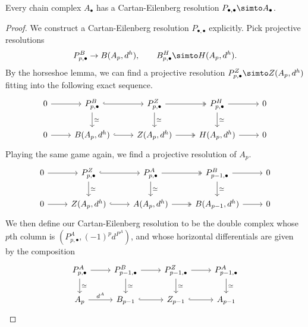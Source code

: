 \documentclass[main.tex]{subfiles}
\begin{document}
\begin{proposition}
  Every chain complex $A_{\bullet}$ has a Cartan-Eilenberg resolution $P_{\bullet,\bullet} \simto A_{\bullet}$.
\end{proposition}
\begin{proof}
  We construct a Cartan-Eilenberg resolution $P_{\bullet,\bullet}$ explicitly. Pick projective resolutions
  \begin{equation*}
    P^{B}_{p,\bullet} \to B(A_{p}, d^{h}),\qquad B^{H}_{p,\bullet} \simto H(A_{p}, d^{h}).
  \end{equation*}
  By the horseshoe lemma, we can find a projective resolution $P^{Z}_{p,\bullet} \simto Z(A_{p}, d^{h})$ fitting into the following exact sequence.
  \begin{equation}
    \label{eq:cartan_eilenberg_resolution_ses_1}
    \begin{tikzcd}
      0
      \arrow[r]
      & P^{B}_{p,\bullet}
      \arrow[r, hook]
      \arrow[d, "\simeq"]
      & P^{Z}_{p,\bullet}
      \arrow[r, two heads]
      \arrow[d, "\simeq"]
      & P^{H}_{p,\bullet}
      \arrow[r]
      \arrow[d, "\simeq"]
      & 0
      \\
      0
      \arrow[r]
      & B(A_{p}, d^{h})
      \arrow[r, hook]
      & Z(A_{p}, d^{h})
      \arrow[r, two heads]
      & H(A_{p}, d^{h})
      \arrow[r]
      & 0
    \end{tikzcd}
  \end{equation}
  Playing the same game again, we find a projective resolution of $A_{p}$.
  \begin{equation}
    \label{eq:cartan_eilenberg_resolution_ses_2}
    \begin{tikzcd}
      0
      \arrow[r]
      & P^{Z}_{p,\bullet}
      \arrow[r, hook]
      \arrow[d, "\simeq"]
      & P^{A}_{p,\bullet}
      \arrow[r, two heads]
      \arrow[d, "\simeq"]
      & P^{B}_{p-1,\bullet}
      \arrow[r]
      \arrow[d, "\simeq"]
      & 0
      \\
      0
      \arrow[r]
      & Z(A_{p}, d^{h})
      \arrow[r, hook]
      & A(A_{p}, d^{h})
      \arrow[r, two heads]
      & B(A_{p-1}, d^{h})
      \arrow[r]
      & 0
    \end{tikzcd}
  \end{equation}
  We then define our Cartan-Eilenberg resolution to be the double complex whose $p$th column is $(P^{A}_{p,\bullet}, (-1)^{p}d^{P^{A}})$, and whose horizontal differentials are given by the composition
  \begin{equation}
    \label{eq:cartan_eilenberg_resolution_horizontal_differentials}
    \begin{tikzcd}
      P^{A}_{p, \bullet}
      \arrow[r]
      \arrow[d, "\simeq"]
      & P^{B}_{p-1, \bullet}
      \arrow[r]
      \arrow[d, "\simeq"]
      & P^{Z}_{p-1, \bullet}
      \arrow[r]
      \arrow[d, "\simeq"]
      & P^{A}_{p-1, \bullet}
      \arrow[d, "\simeq"]
      \\
      A_{p}
      \arrow[r, "d^{A}"]
      & B_{p-1}
      \arrow[r, hook]
      & Z_{p-1}
      \arrow[r, hook]
      & A_{p-1}
    \end{tikzcd}
  \end{equation}


\end{proof}
\end{document}
